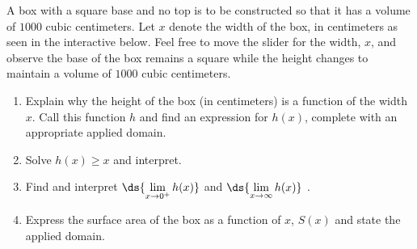 \documentclass{ximera}
\begin{document}
\begin{example}  \label{boxnotopfixedvolume} A box with a square base and no top is to be constructed so that it has a volume of $1000$ cubic centimeters.  Let $x$ denote the width of the box, in centimeters as seen in the interactive below.  Feel free to move the slider for the width, $x$, and observe the base of the box remains a square while the height changes to maintain a volume of $1000$ cubic centimeters.

\begin{center}
\end{center}







\begin{enumerate}

\item  Explain why the height of the box (in centimeters) is a function of the width $x$. Call this function $h$ and find an expression for $h(x)$, complete with an appropriate applied domain.

\item  Solve $h(x) \geq x$ and interpret.

\item  Find and interpret $\ds{\lim_{x \rightarrow 0^{+}} h(x)}$ and $\ds{\lim_{x \rightarrow \infty} h(x)}$ .

\item  Express the surface area of the box as a function of $x$, $S(x)$ and state the applied domain.


\end{enumerate}
\end{example}
\end{document}
